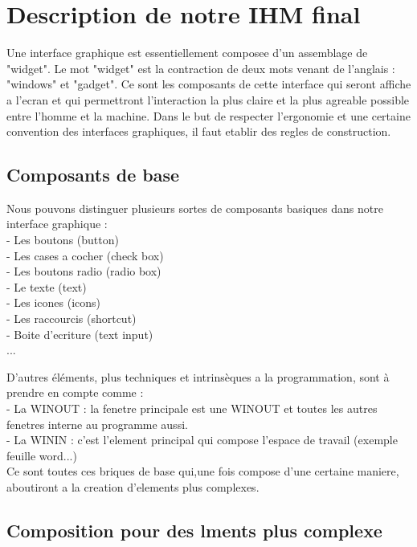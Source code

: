 \documentclass[fleqn]{article-hermes}
\begin{document}
\section{Description de notre IHM final}
Une interface graphique est essentiellement composee d'un assemblage de "widget".
Le mot "widget" est la contraction de deux mots venant de l'anglais : "windows" et "gadget".
Ce sont les composants de cette interface qui seront affiche a l'ecran et qui permettront
l'interaction la plus claire et la plus agreable possible entre l'homme et la machine.
Dans le but de respecter l'ergonomie et une certaine convention des interfaces graphiques,
il faut etablir des regles de construction.

\subsection{Composants de base}

Nous pouvons distinguer plusieurs sortes de composants basiques dans notre interface graphique :\\
- Les boutons (button)\\
- Les cases a cocher (check box)\\
- Les boutons radio (radio box)\\
- Le texte (text)\\
- Les icones (icons)\\
- Les raccourcis (shortcut)\\
- Boite d'ecriture (text input)\\
...

D'autres éléments, plus techniques et intrinsèques a la programmation, sont à prendre en compte comme :\\
- La WINOUT : la fenetre principale est une WINOUT et toutes les autres fenetres interne au programme aussi.\\
- La WININ : c'est l'element principal qui compose l'espace de travail (exemple feuille word...)\\

Ce sont toutes ces briques de base qui,une fois compose d'une certaine maniere, aboutiront a la
creation d'elements plus complexes.

\subsection{Composition pour des lments plus complexe}
\end{document}
